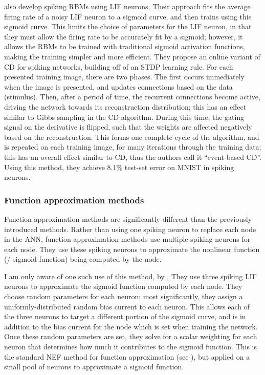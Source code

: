\textcite{Neftci2013} also develop spiking RBMs using LIF neurons.
Their approach fits the average firing rate of a noisy LIF neuron
to a sigmoid curve,
and then trains using this sigmoid curve.
This limits the choice of parameters for the LIF neuron,
in that they must allow the firing rate to be accurately fit by a sigmoid;
however, it allows the RBMs to be trained with traditional sigmoid activation functions,
making the training simpler and more efficient.
They propose an online variant of CD for spiking networks,
building off of an STDP learning rule.
For each presented training image, there are two phases.
The first occurs immediately when the image is presented,
and updates connections based on the data (stimulus).
Then, after a period of time, the recurrent connections become active,
driving the network towards its reconstruction distribution;
this has an effect similar to Gibbs sampling in the CD algorithm.
During this time, the gating signal on the derivative is flipped,
such that the weights are affected negatively based on the reconstruction.
This forms one complete cycle of the algorithm,
and is repeated on each training image,
for many iterations through the training data;
this has an overall effect similar to CD,
thus the authors call it ``event-based CD''.
Using this method, they achieve 8.1\% test-set error on MNIST in spiking neurons.


\subsubsection{Function approximation methods}

Function approximation methods are significantly different than
the previously introduced methods.
Rather than using one spiking neuron to replace each node in the ANN,
function approximation methods use multiple spiking neurons for each node.
They use these spiking neurons to approximate the nonlinear function
(\eg/ sigmoid function) being computed by the node.

I am only aware of one such use of this method, by \textcite{Eliasmith2012}.
They use three spiking LIF neurons to approximate the sigmoid function
computed by each node.
They choose random parameters for each neuron;
most significantly,
they assign a uniformly-distributed random bias current to each neuron.
This allows each of the three neurons to target a different portion of
the sigmoid curve,
and is in addition to the bias current for the node
which is set when training the network.
Once these random parameters are set,
they solve for a scalar weighting for each neuron
that determines how much it contributes to the sigmoid function.
This is the standard NEF method for function approximation (see ),
but applied on a small pool of neurons to approximate a sigmoid function.

